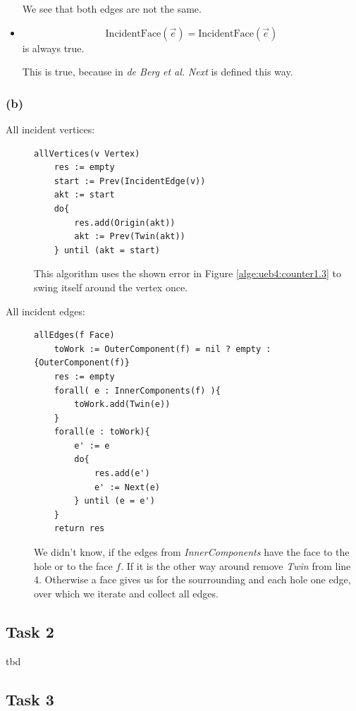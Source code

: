 \documentclass[11pt,a4paper,ngerman]{article}
\begin{document}
\begin{itemize}
        We see that both edges are not the same.
    \item
        \begin{equation*}
            \text{IncidentFace}(\overrightarrow{e}) = \text{IncidentFace}(\overrightarrow{e})
        \end{equation*}
        is always true.

        This is true, because in \emph{de Berg et al.} \emph{Next} is defined this way.
\end{itemize}

\subsubsection*{(b)}

\begin{description}
    \item[All incident vertices:]\mbox{}
\begin{lstlisting}
allVertices(v Vertex)
    res := empty
    start := Prev(IncidentEdge(v))
    akt := start
    do{
        res.add(Origin(akt))
        akt := Prev(Twin(akt))
    } until (akt = start)
\end{lstlisting}
    This algorithm uses the shown error in Figure \ref{alge:ueb4:counter1.3} to swing itself around the vertex once.
    \item[All incident edges:]\mbox{}
\begin{lstlisting}
allEdges(f Face)
    toWork := OuterComponent(f) = nil ? empty : {OuterComponent(f)}
    res := empty
    forall( e : InnerComponents(f) ){
        toWork.add(Twin(e))
    }
    forall(e : toWork){
        e' := e
        do{
            res.add(e')
            e' := Next(e)
        } until (e = e')
    }
    return res
\end{lstlisting}
We didn't know, if the edges from \emph{InnerComponents} have the face to the
hole or to the face $f$. If it is the other way around remove \emph{Twin} from line
4. Otherwise a face gives us for the sourrounding and each hole one edge, over which we iterate
and collect all edges.
\end{description}

\subsection*{Task 2}

tbd

\subsection*{Task 3}
\end{document}
